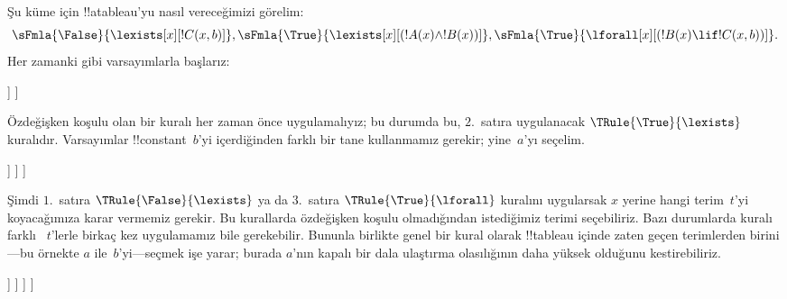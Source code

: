 \begin{ex}
Şu küme için !!a{tableau}'yu nasıl vereceğimizi görelim:
\[
\sFmla{\False}{\lexists[x][!C(x,b)]},
\sFmla{\True}{\lexists[x][(!A(x) \land !B(x))]},
\sFmla{\True}{\lforall[x][(!B(x) \lif !C(x,b))]}.
\]
Her zamanki gibi varsayımlarla başlarız:
\begin{oltableau}
  [\sFmla{\False}{\lexists[x][\formula{C}(x,b)]}, just=\TAss
    [\sFmla{\True}{\lexists[x][(\formula{A}(x) \land \formula{B}(x))]},
      just=\TAss
      [\sFmla{\True}{\lforall[x][(\formula{B}(x) \lif \formula{C}(x,b))]},
        just=\TAss]
    ]
  ]
\end{oltableau}
Özdeğişken koşulu olan bir kuralı her zaman önce uygulamalıyız; bu durumda
bu, $2$.~satıra uygulanacak $\TRule{\True}{\lexists}$ kuralıdır.
Varsayımlar !!{constant}~$b$'yi içerdiğinden farklı bir tane kullanmamız
gerekir; yine~$a$'yı seçelim.
\begin{oltableau}
  [\sFmla{\False}{\lexists[x][\formula{C}(x,b)]}, just=\TAss
    [\sFmla{\True}{\lexists[x][(\formula{A}(x) \land \formula{B}(x))]},
      just=\TAss, checked
      [\sFmla{\True}{\lforall[x][(\formula{B}(x) \lif \formula{C}(x,b))]},
        just=\TAss
        [\sFmla{\True}{\formula{A}(a) \land \formula{B}(a)},
          just={\TRule{\True}{\lexists}[2]}]
      ]
    ]
  ]
\end{oltableau}
Şimdi $1$.~satıra $\TRule{\False}{\lexists}$ ya da $3$.~satıra
$\TRule{\True}{\lforall}$ kuralını uygularsak $x$ yerine hangi terim~$t$'yi
koyacağımıza karar vermemiz gerekir. Bu kurallarda özdeğişken koşulu
olmadığından istediğimiz terimi seçebiliriz. Bazı durumlarda kuralı farklı
~$t$'lerle birkaç kez uygulamamız bile gerekebilir. Bununla birlikte genel
bir kural olarak !!{tableau} içinde zaten geçen terimlerden birini---bu
örnekte $a$ ile~$b$'yi---seçmek işe yarar; burada $a$'nın kapalı bir dala
ulaştırma olasılığının daha yüksek olduğunu kestirebiliriz.
\begin{oltableau}
  [\sFmla{\False}{\lexists[x][\formula{C}(x,b)]}, just=\TAss
    [\sFmla{\True}{\lexists[x][(\formula{A}(x) \land \formula{B}(x))]},
      just=\TAss, checked
      [\sFmla{\True}{\lforall[x][(\formula{B}(x) \lif \formula{C}(x,b))]}, just=\TAss
        [\sFmla{\True}{\formula{A}(a) \land \formula{B}(a)}, just={\TRule{\True}{\lexists}[2]}
          [\sFmla{\False}{\formula{C}(a,b)}, just={\TRule{\False}{\lexists}[1]}
            [\sFmla{\True}{\formula{B}(a) \lif \formula{C}(a,b)},
              just={\TRule{\True}{\lforall}[3]}
            ]
          ]
        ]
      ]
    ]

\end{oltableau}
\end{ex}
